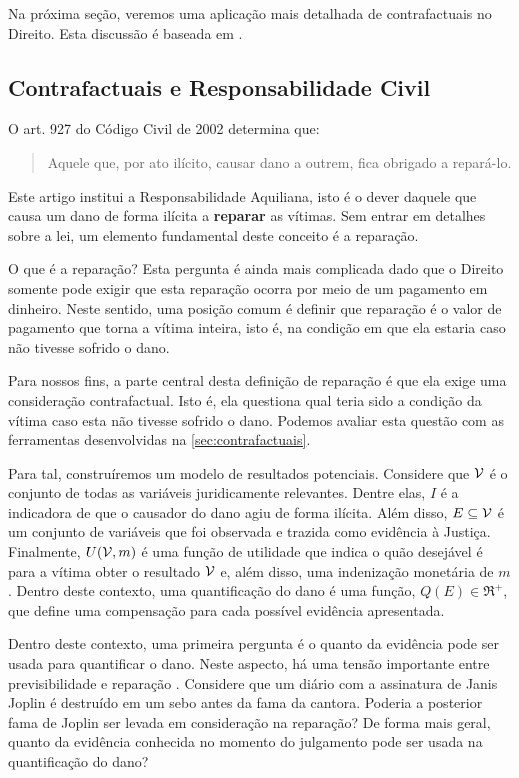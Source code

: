 Na próxima seção, veremos
uma aplicação mais detalhada de
contrafactuais no Direito.
Esta discussão é baseada em
\citet{Stern2019}.

\subsection{Contrafactuais e Responsabilidade Civil}
\label{sec:counterfactual_law}

O art. 927 do Código Civil de 2002 determina que:

\begin{quote}
 Aquele que, por ato ilícito, 
 causar dano a outrem, 
 fica obrigado a repará-lo.
\end{quote}

Este artigo institui a Responsabilidade Aquiliana,
isto é o dever daquele que causa um dano 
de forma ilícita a \textbf{reparar} as vítimas.
Sem entrar em detalhes sobre a lei,
um elemento fundamental deste conceito é a reparação.

O que é a reparação?
Esta pergunta é ainda mais complicada dado que
o Direito somente pode exigir que
esta reparação ocorra por meio de 
um pagamento em dinheiro.
Neste sentido, uma posição comum é
definir que reparação é 
o valor de pagamento que 
torna a vítima inteira, isto é,
na condição em que ela estaria caso
não tivesse sofrido o dano.

Para nossos fins,
a parte central desta definição de reparação é que
ela exige uma consideração contrafactual. Isto é,
ela questiona qual teria sido a condição da vítima
caso esta não tivesse sofrido o dano.
Podemos avaliar esta questão com
as ferramentas desenvolvidas 
na \cref{sec:contrafactuais}.

Para tal, construíremos 
um modelo de resultados potenciais.
Considere que ${\mathcal V}$ é
o conjunto de todas as variáveis juridicamente relevantes.
Dentre elas, $I$ é a indicadora de que
o causador do dano agiu de forma ilícita.
Além disso, $E \subseteq {\mathcal V}$ é 
um conjunto de variáveis que foi observada e
trazida como evidência à Justiça.
Finalmente, $U({\mathcal V}, m)$ é 
uma função de utilidade que
indica o quão desejável é para a vítima
obter o resultado ${\mathcal V}$ e, além disso,
uma indenização monetária de $m$.
Dentro deste contexto, 
uma quantificação do dano é
uma função, $Q(E) \in \Re^{+}$, que 
define uma compensação para 
cada possível evidência apresentada.

Dentro deste contexto,
uma primeira pergunta é
o quanto da evidência pode ser usada
para quantificar o dano.
Neste aspecto, há uma tensão importante entre
previsibilidade e reparação \citep{Fisher1990}.
Considere que um diário com a assinatura de Janis Joplin é
destruído em um sebo antes da fama da cantora.
Poderia a posterior fama de Joplin 
ser levada em consideração na reparação?
De forma mais geral, quanto da evidência conhecida
no momento do julgamento pode ser usada
na quantificação do dano?

